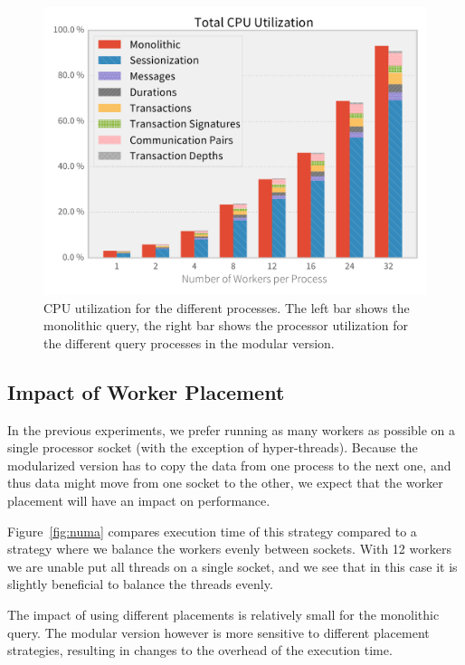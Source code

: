 \begin{figure}[p]
  \centering
    \includegraphics[width=1\textwidth]{figures/evaluation/cpu_tot}
    \caption[Total CPU utilization]{CPU utilization for the different
    processes. The left bar shows the monolithic query, the right bar shows the
    processor utilization for the different query processes in the modular version.}
    \label{fig:cpu}
\end{figure}
\clearpage
\subsection{Impact of Worker Placement} \label{sec:evalnuma}

In the previous experiments, we prefer running as many workers as possible
on a single processor socket (with the exception of hyper-threads). Because
the modularized version has to copy the data from one process to the next one,
and thus data might move from one socket to the other, we expect that the
worker placement will have an impact on performance.

Figure~\ref{fig:numa} compares execution time of this strategy compared to a
strategy where we balance the workers evenly between sockets. With 12 workers
we are unable put all threads on a single socket, and we see that in this case
it is slightly beneficial to balance the threads evenly.

The impact of using different placements is relatively small for the
monolithic query. The modular version however is more sensitive to
different placement strategies, resulting in changes to the overhead
of the execution time.


